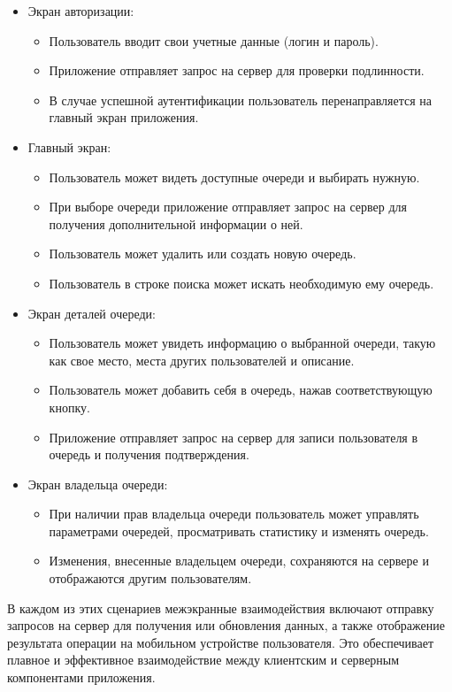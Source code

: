 \begin{itemize}
   \item Экран авторизации:
		\begin{itemize}
			\item Пользователь вводит свои учетные данные (логин и пароль).
			\item Приложение отправляет запрос на сервер
				для проверки подлинности.
			\item В случае успешной аутентификации пользователь
				перенаправляется на главный экран приложения.
		\end{itemize}
   \item Главный экран:
		\begin{itemize}
			\item Пользователь может видеть доступные очереди
				и выбирать нужную.
			\item При выборе очереди приложение отправляет запрос
				на сервер для получения дополнительной информации о ней.
			\item Пользователь может удалить или создать новую очередь.
			\item Пользователь в строке поиска может
				искать необходимую ему очередь.
		\end{itemize}
   \item Экран деталей очереди:
		\begin{itemize}
			\item Пользователь может увидеть информацию о выбранной очереди,
				такую как свое место, места других пользователей и описание.
			\item Пользователь может добавить себя в очередь,
				нажав соответствующую кнопку.
			\item Приложение отправляет запрос на сервер
				для записи пользователя в очередь и получения подтверждения.
		\end{itemize}
   \item Экран владельца очереди:
		\begin{itemize}
			\item При наличии прав владельца очереди пользователь
				может управлять параметрами очередей,
				просматривать статистику и изменять очередь.
			\item Изменения, внесенные владельцем очереди,
				сохраняются на сервере и отображаются другим пользователям.
		\end{itemize}
\end{itemize}

В каждом из этих сценариев межэкранные взаимодействия включают отправку
запросов на сервер для получения или обновления данных,
а также отображение результата операции на мобильном устройстве пользователя.
Это обеспечивает плавное и эффективное взаимодействие
между клиентским и серверным компонентами приложения.

